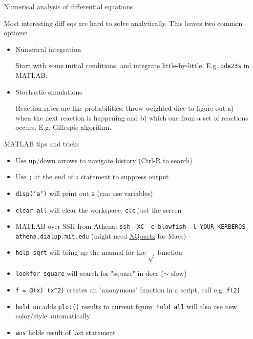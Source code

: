 \documentclass[handout]{beamer} %
\begin{document}
\begin{frame}{Numerical analysis of differential equations}

Most interesting diff eqs are hard to solve analytically. This leaves two common options: \pause
\begin{itemize}
	\item Numerical integration \pause
	
	Start with some initial conditions, and integrate little-by-little. E.g. \texttt{ode23s} in MATLAB. \pause
	
	\item Stochastic simulations \pause
	
	Reaction rates are like probabilities: throw weighted dice to figure out a) when the next reaction is happening and b) which one from a set of reactions occurs. E.g. Gillespie algorithm.
\end{itemize}

\end{frame}

\begin{frame}{MATLAB tips and tricks}
\begin{itemize}
    \item Use up/down arrows to navigate history (Ctrl-R to search)
    \item Use \texttt{;} at the end of a statement to suppress output
    \item \texttt{disp('a')} will print out \texttt{a} (can use variables)
    \item \texttt{clear all} will clear the workspace, \texttt{clc} just the screen
    \item MATLAB over SSH from Athena: \texttt{ssh -XC -c blowfish -l YOUR\_KERBEROS athena.dialup.mit.edu} (might need \href{http://xquartz.macosforge.org/landing/}{XQuartz} for Macs)
    \item \texttt{help sqrt} will bring up the manual for the $\sqrt{}$ function
    \item \texttt{lookfor square} will search for "square" in docs ($\sim$ slow)
    \item \texttt{f = @(x) (x\^{}2)} creates an "anonymous" function in a script,
        call e.g. \texttt{f(2)}
    \item \texttt{hold on} adds \texttt{plot()} results to current figure; \texttt{hold all} will also use new color/style automatically
    \item \texttt{ans} holds result of last statement
\end{itemize}
\end{frame}
\end{document}
